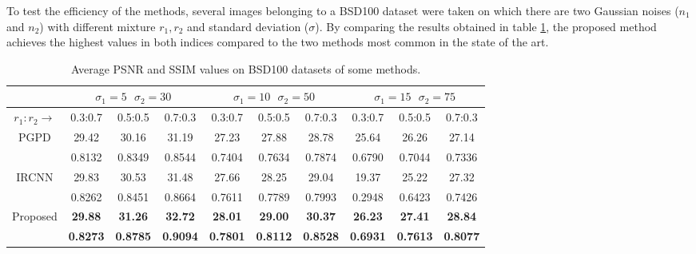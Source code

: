 To test the efficiency of the methods, several images belonging to a 
BSD100 dataset \cite{0884882842} were taken on which there are two Gaussian noises ($n_1$ 
and $n_2$) with different mixture $r_1, r_2$ and standard deviation ($\sigma$). By comparing the 
results obtained in table \ref{indexCompare}, the proposed method achieves the highest values 
in both indices compared to the two methods \cite{0884882815} \cite{0884882819} most common in the 
state of the art.
\begin{table}[h!]
    \centering
    \begin{adjustbox}{max width=\textwidth}
    \begin{tabular}{|c||ccc|ccc|ccc|}
        \hline
            & \multicolumn{3}{c||}{$\sigma_1=5 ~~~\sigma_2=30 $} & \multicolumn{3}{c||}{$\sigma_1=10 ~~~\sigma_2=50 $} & \multicolumn{3}{c||}{$\sigma_1=15 ~~~\sigma_2=75 $}\\
        \hline        
        $r_1:r_2\rightarrow$ & 0.3:0.7 & 0.5:0.5 & 0.7:0.3 & 0.3:0.7 & 0.5:0.5 & 0.7:0.3 & 0.3:0.7 & 0.5:0.5 & 0.7:0.3\\
        \hline 
        \hline
        \multirow{2}{*}{PGPD\cite{0884882815}} & 29.42 & 30.16 & 31.19 & 27.23 & 27.88 & 28.78 &25.64 & 26.26 & 27.14\\
        & 0.8132 & 0.8349 & 0.8544 & 0.7404 & 0.7634 & 0.7874 & 0.6790 & 0.7044 & 0.7336\\
        \hline
        \multirow{2}{*}{IRCNN\cite{0884882819}} & 29.83 & 30.53 & 31.48 & 27.66 & 28.25 & 29.04 & 19.37 & 25.22 & 27.32\\
        & 0.8262 & 0.8451 & 0.8664 & 0.7611 & 0.7789 & 0.7993 & 0.2948 & 0.6423 & 0.7426\\
        \hline
        \multirow{2}{*}{Proposed} & \bfseries{29.88} & \bfseries{31.26} & \bfseries{32.72} & \bfseries{28.01} & \bfseries{29.00} & \bfseries{30.37} & \bfseries{26.23} & \bfseries{27.41} & \bfseries{28.84}\\
        & \bfseries{0.8273} & \bfseries{0.8785} & \bfseries{0.9094} & \bfseries{0.7801} & \bfseries{0.8112} & \bfseries{0.8528} & \bfseries{0.6931} & \bfseries{0.7613} & \bfseries{0.8077}\\
        \hline
    \end{tabular}
    \end{adjustbox}
    \caption{Average PSNR and SSIM values on BSD100 datasets of some methods.}
    \label{indexCompare}
\end{table}
